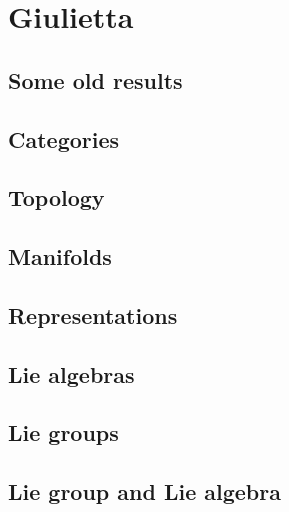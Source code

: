 \documentclass[french,a4paper]{book}
\begin{document}

\emptyInputPath
{}

\part{Giulietta}

\chapter{Some old results}


\chapter{Categories}        \label{chap_category}


\chapter{Topology}              \label{chap_topology}



\chapter{Manifolds} \label{Chapitre_FB}






\chapter{Representations}


\chapter{Lie algebras}







\chapter{Lie groups}


\chapter{Lie group and Lie algebra}



\end{document}
